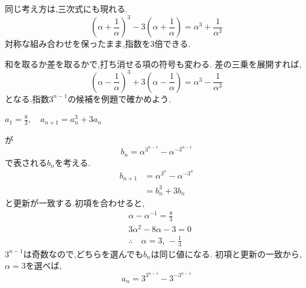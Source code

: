同じ考え方は,三次式にも現れる.
\[
  \left(\alpha+\frac{1}{\alpha}\right)^3
  -3\left(\alpha+\frac{1}{\alpha}\right)
  =\alpha^3+\frac{1}{\alpha^3}
\]
対称な組み合わせを保ったまま,指数を3倍できる.

和を取るか差を取るかで,打ち消せる項の符号も変わる.
差の三乗を展開すれば,
\[
  \left(\alpha-\frac{1}{\alpha}\right)^3
  +3\left(\alpha-\frac{1}{\alpha}\right)
  =\alpha^3-\frac{1}{\alpha^3}
\]
となる.指数$3^{n-1}$の候補を例題で確かめよう.

\noindent{}\par\nobreak
\begin{smallquote}
  $\displaystyle a_1=\frac{8}{3},\quad a_{n+1}=a_n^3+3a_n$
\end{smallquote}
\begin{smallquote}
  が
    \[
      b_n=\alpha^{3^{n-1}}-\alpha^{-3^{n-1}}
    \]
    で表される$b_n$を考える.
    \begin{align*}
      b_{n+1}&=\alpha^{3^{n}}-\alpha^{-3^{n}}\\
      &=b_n^3+3b_n
    \end{align*}
    と更新が一致する.初項を合わせると,
    \begin{align*}
      &\alpha-\alpha^{-1}=\frac{8}{3}\\
      &3\alpha^2-8\alpha-3=0\\
      &\therefore \quad \alpha=3,\,-\frac13
    \end{align*}
    $3^{n-1}$は奇数なので,どちらを選んでも$b_n$は同じ値になる.
    初項と更新の一致から,$\alpha=3$を選べば,
    \[
      a_n=3^{3^{n-1}}-3^{-3^{n-1}}
    \]
\end{smallquote}
